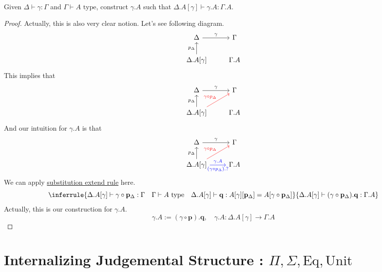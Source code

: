 \documentclass[12pt, a4paper, openany, twoside]{book}
\theoremstyle{definition}
\theoremstyle{remark}
\theoremstyle{plain}
\numberwithin{equation}{section}
\begin{document}
\begin{tcolorbox}[colback=yellow!10!white,colframe=brown!75!black,title=Exercise 2.3]\hypertarget{gamma.A}{}
    Given $\Delta \vdash \gamma : \Gamma$ and $\Gamma \vdash A \text{ type}$, construct $\gamma.A$ such that 
    $\Delta.A[\gamma] \vdash \gamma.A : \Gamma.A$. 
    \begin{proof}
        Actually, this is also very clear notion. Let's see following diagram. 
        \[
        \begin{tikzcd}
            \Delta \arrow[r, "\gamma"] & \Gamma \\
            \Delta.A[\gamma] \arrow[u, "p_\Delta"] & \Gamma.A
        \end{tikzcd}
        \]
        This implies that 
        \[
        \begin{tikzcd}
            \Delta \arrow[r, "\gamma"] & \Gamma \\
            \Delta.A[\gamma] \arrow[u, "p_\Delta"] \arrow[ru, "\gamma \circ p_\Delta", red] & \Gamma.A
        \end{tikzcd}
        \]
        And our intuition for $\gamma.A$ is that 
        \[
        \begin{tikzcd}
            \Delta \arrow[r, "\gamma"] & \Gamma \\
            \Delta.A[\gamma] \arrow[r, "\gamma.A", "(\gamma \circ p_\Delta).?"', blue] \arrow[u, "p_\Delta"] \arrow[ru, "\gamma \circ p_\Delta", red] & \Gamma.A
        \end{tikzcd}
        \]
        We can apply \hyperlink{subst extend}{substitution extend rule} here. 
        \[
        \inferrule
        {\Delta.A[\gamma] \vdash \gamma \circ \mathbf{p}_\Delta : \Gamma \quad \Gamma \vdash A \text{ type} \quad \Delta.A[\gamma] \vdash \mathbf{q} : A[\gamma][\mathbf{p}_\Delta] = A[\gamma \circ \mathbf{p}_\Delta]}
        {\Delta.A[\gamma] \vdash (\gamma \circ \mathbf{p}_\Delta).\mathbf{q} : \Gamma.A}
        \]
        Actually, this is our construction for $\gamma.A$. 
        \[\gamma.A := (\gamma \circ \mathbf{p}).\mathbf{q}, \quad \gamma.A : \Delta.A[\gamma] \rightarrow \Gamma.A\]
    \end{proof}
\end{tcolorbox}

\newpage 

\chapter{Internalizing Judgemental Structure : $\Pi, \Sigma, \text{Eq}, \text{Unit}$}
\end{document}
